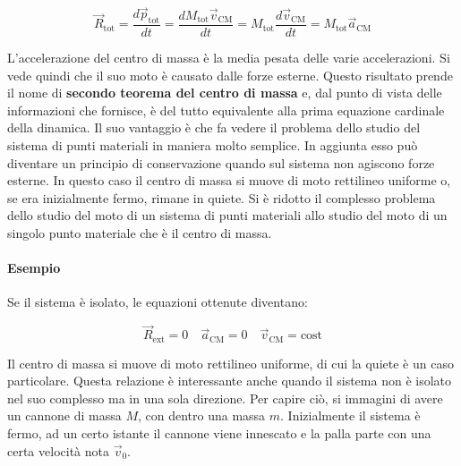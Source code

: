 \[
	\boxed{\vec{R}_\text{tot}=\frac{d\vec{p}_\text{tot}}{dt}=\frac{dM_\text{tot}\vec{v}_\text{CM}}{dt}=M_\text{tot}\frac{d\vec{v}_\text{CM}}{dt}=M_\text{tot}\vec{a}_\text{CM}}
\]

L'accelerazione del centro di massa è la media pesata delle varie accelerazioni. Si vede quindi che il suo moto è causato dalle forze esterne.  Questo risultato prende il nome di \textbf{secondo teorema del centro di massa} e, dal punto di vista delle informazioni che fornisce, è del tutto equivalente alla prima equazione cardinale della dinamica. Il suo vantaggio è che fa vedere il problema dello studio del sistema di punti materiali in maniera molto semplice.
In aggiunta esso può diventare un principio di conservazione quando sul sistema non agiscono forze esterne. In questo caso il centro di massa si muove di moto rettilineo uniforme o, se era inizialmente fermo, rimane in quiete.
Si è ridotto il complesso problema dello studio del moto di un sistema di punti materiali allo studio del moto di un singolo punto materiale che è il centro di massa.

\paragraph{Esempio} Se il sistema è isolato, le equazioni ottenute diventano:

\[
	\vec{R}_\text{ext}=0 \quad \vec{a}_\text{CM}=0 \quad \vec{v}_\text{CM}=\text{cost}
\]

Il centro di massa si muove di moto rettilineo uniforme, di cui la quiete è un caso particolare. Questa relazione è interessante anche quando il sistema non è isolato nel suo complesso ma in una sola direzione. Per capire ciò, si immagini di avere un cannone di massa $M$, con dentro una massa $m$. Inizialmente il sistema è fermo, ad un certo istante il cannone viene innescato e la palla parte con una certa velocità nota $\vec{v}_0$.

